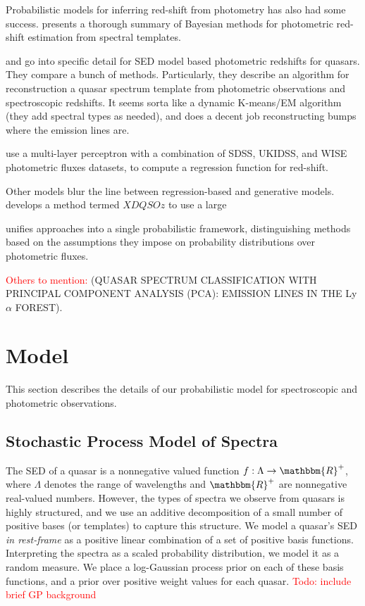 \documentclass{article}
\newcommand{\R}{\mathbbm{R}}
\newcommand{\red}[1]{\textcolor{red}{#1}}
\begin{document}
Probabilistic models for inferring red-shift from photometry has also had some success.  \cite{benitez2000bayesian} presents a thorough summary of Bayesian methods for photometric red-shift estimation from spectral templates.  

\cite{budavari2001photometric} and \cite{richards2001photometric} go into specific detail for SED model based photometric redshifts for quasars.  They compare a bunch of methods. Particularly, they describe an algorithm for reconstruction a quasar spectrum template from photometric observations and spectroscopic redshifts.  It seems sorta like a dynamic K-means/EM algorithm (they add spectral types as needed), and does a decent job reconstructing bumps where the emission lines are.  

\cite{brescia2013photometric} use a multi-layer perceptron with a combination of SDSS, UKIDSS, and WISE photometric fluxes datasets, to compute a regression function for red-shift.  

Other models blur the line between regression-based and generative models.  \cite{bovy2012photometric} develops a method termed $XDQSOz$ to use a large 

\cite{budavari2009unified} unifies approaches into a single probabilistic framework, distinguishing methods based on the assumptions they impose on probability distributions over photometric fluxes.  

\red{Others to mention: }
\cite{suzuki2006quasar} (QUASAR SPECTRUM CLASSIFICATION WITH PRINCIPAL COMPONENT ANALYSIS (PCA): EMISSION LINES IN THE Ly$\alpha$ FOREST). 


\section{Model}
This section describes the details of our probabilistic model for spectroscopic and photometric observations.  

\subsection{Stochastic Process Model of Spectra}
The SED of a quasar is a nonnegative valued function $f : \Lambda \rightarrow \R^+$, where $\Lambda$ denotes the range of wavelengths and $\R^+$ are nonnegative real-valued numbers.  However, the types of spectra we observe from quasars is highly structured, and we use an additive decomposition of a small number of positive bases (or templates) to capture this structure.   We model a quasar's SED \emph{in rest-frame} as a positive linear combination of a set of positive basis functions.  Interpreting the spectra as a scaled probability distribution, we model it as a random measure.  We place a log-Gaussian process prior on each of these basis functions, and a prior over positive weight values for each quasar.  
\red{Todo: include brief GP background}
\end{document}
